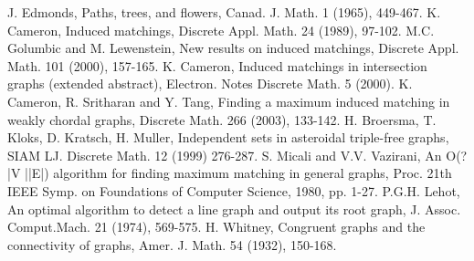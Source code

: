 \documentclass[14pt,a4paper]{extreport}
\begin{document}
\begin{thebibliography}{9} 

	  J. Edmonds, Paths, trees, and flowers, Canad. J. Math. 1 (1965), 449-467.
	  K. Cameron, Induced matchings, Discrete Appl. Math. 24 (1989), 97-102.
	  M.C. Golumbic and M. Lewenstein, New results on induced matchings, Discrete Appl. Math. 101 (2000), 157-165.
	  K. Cameron, Induced matchings in intersection graphs (extended abstract), Electron. Notes Discrete Math. 5 (2000).
	  K. Cameron, R. Sritharan and Y. Tang, Finding a maximum induced matching in weakly chordal graphs, Discrete Math. 266 (2003), 133-142.
	  H. Broersma, T. Kloks, D. Kratsch, H. Muller, Independent sets in asteroidal triple-free graphs, SIAM LJ. Discrete Math. 12 (1999) 276-287.
	  S. Micali and V.V. Vazirani, An O(?|V ||E|) algorithm for finding maximum matching in general graphs, Proc. 21th IEEE Symp. on Foundations of Computer Science, 1980, pp. 1-27.
	  P.G.H. Lehot, An optimal algorithm to detect a line graph and output its root graph, J. Assoc. Comput.Mach. 21 (1974), 569-575.
	  H. Whitney, Congruent graphs and the connectivity of graphs, Amer. J. Math. 54 (1932), 150-168.
	
	
	
\end{thebibliography}
\end{document}
